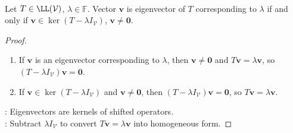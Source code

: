 \begin{proposition} \label{prop:eigenvectors-as-kernel-vectors} \\
Let $T\in\LL(\mathcal{V})$, $\lambda\in\mathbb{F}$. Vector $\mathbf{v}$ is eigenvector of $T$ corresponding to $\lambda$ if and only if $\mathbf{v}\in\ker(T-\lambda I_{\mathcal{V}})$, $\mathbf{v}\neq\mathbf{0}$.
\begin{proof}
\begin{enumerate}[label=\roman*.]
\setlength{\itemsep}{0pt}
\item[$(\Rightarrow)$] If $\mathbf{v}$ is an eigenvector corresponding to $\lambda$, then $\mathbf{v}\neq\mathbf{0}$ and $T\mathbf{v}=\lambda\mathbf{v}$, so $(T-\lambda I_{\mathcal{V}})\mathbf{v}=\mathbf{0}$.
\item[$(\Leftarrow)$] If $\mathbf{v}\in\ker(T-\lambda I_{\mathcal{V}})$ and $\mathbf{v}\neq\mathbf{0}$, then $(T-\lambda I_{\mathcal{V}})\mathbf{v}=\mathbf{0}$, so $T\mathbf{v}=\lambda\mathbf{v}$.
\end{enumerate}
: Eigenvectors are kernels of shifted operators.\\
: Subtract $\lambda I_{\mathcal{V}}$ to convert $T\mathbf{v}=\lambda\mathbf{v}$ into homogeneous form.
\end{proof}
\end{proposition}


